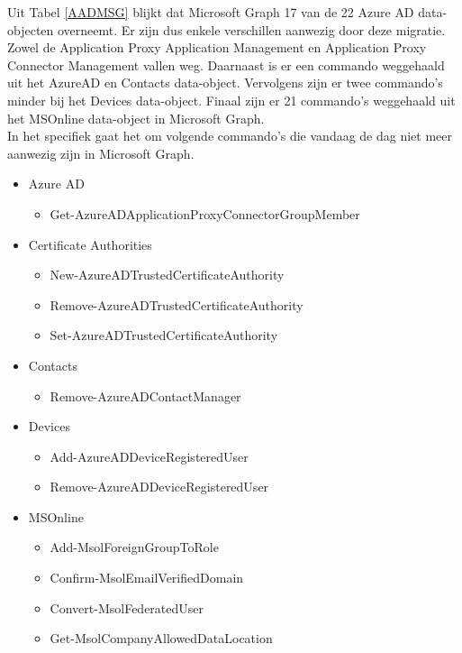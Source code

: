 Uit Tabel \ref{AADMSG} blijkt dat Microsoft Graph 17 van de 22 Azure \ac{AD} data-objecten overneemt. Er zijn dus enkele verschillen aanwezig door deze migratie. Zowel de Application Proxy Application Management en Application Proxy Connector Management vallen weg. Daarnaast is er een commando weggehaald uit het AzureAD en Contacts data-object. Vervolgens zijn er twee commando's minder bij het Devices data-object. Finaal zijn er 21 commando's weggehaald uit het MSOnline data-object in Microsoft Graph. \\

In het specifiek gaat het om volgende commando's die vandaag de dag niet meer aanwezig zijn in Microsoft Graph.

\begin{itemize}
    \item Azure AD
    \begin{itemize}
        \item Get-AzureADApplicationProxyConnectorGroupMember
    \end{itemize}
    \item Certificate Authorities
    \begin{itemize}
        \item New-AzureADTrustedCertificateAuthority
        \item Remove-AzureADTrustedCertificateAuthority
        \item Set-AzureADTrustedCertificateAuthority
    \end{itemize}
    \item Contacts
    \begin{itemize}
        \item Remove-AzureADContactManager
    \end{itemize}
    \item Devices
    \begin{itemize}
        \item Add-AzureADDeviceRegisteredUser
        \item Remove-AzureADDeviceRegisteredUser
    \end{itemize}
    \item MSOnline
    \begin{itemize}
        \item Add-MsolForeignGroupToRole
        \item Confirm-MsolEmailVerifiedDomain
        \item Convert-MsolFederatedUser
        \item Get-MsolCompanyAllowedDataLocation

\end{itemize}
\end{itemize}
